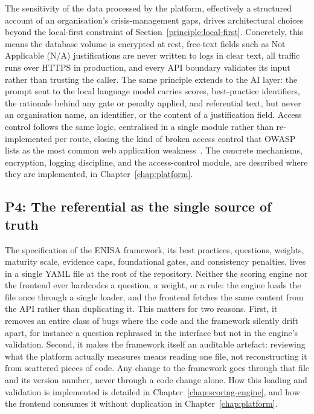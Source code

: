 The sensitivity of the data processed by the platform, effectively a
structured account of an organisation's crisis-management gaps, drives
architectural choices beyond the local-first constraint of
Section~\ref{principle:local-first}. Concretely, this means the database
volume is encrypted at rest, free-text fields such as Not Applicable (N/A) justifications
are never written to logs in clear text, all traffic runs over HTTPS in
production, and every API boundary validates its input rather than
trusting the caller. The same principle extends to the AI layer: the
prompt sent to the local language model carries scores, best-practice
identifiers, the rationale behind any gate or penalty applied, and
referential text, but never an organisation name, an identifier, or the
content of a justification field. Access control
follows the same logic, centralised in a single module rather than
re-implemented per route, closing the kind of broken access control that
OWASP lists as the most common web application weakness~\cite{owasp_top10_a01_2021}.
The concrete
mechanisms, encryption, logging discipline, and the access-control module,
are described where they are implemented, in Chapter~\ref{chap:platform}.

\subsection{P4: The referential as the single source of truth}
\label{principle:referential-truth}

The specification of the ENISA framework, its best practices, questions,
weights, maturity scale, evidence caps, foundational gates, and
consistency penalties, lives in a single YAML file at the root of the
repository. Neither the scoring engine nor the frontend ever hardcodes a
question, a weight, or a rule: the engine loads the file once through a
single loader, and the frontend fetches the same content from the API
rather than duplicating it. This matters for two reasons. First, it
removes an entire class of bugs where the code and the framework silently
drift apart, for instance a question rephrased in the interface but not in
the engine's validation. Second, it makes the framework itself an
auditable artefact: reviewing what the platform actually measures means
reading one file, not reconstructing it from scattered pieces of code. Any
change to the framework goes through that file and its version number,
never through a code change alone. How this loading and validation is
implemented is detailed in Chapter~\ref{chap:scoring-engine}, and how the
frontend consumes it without duplication in Chapter~\ref{chap:platform}.

